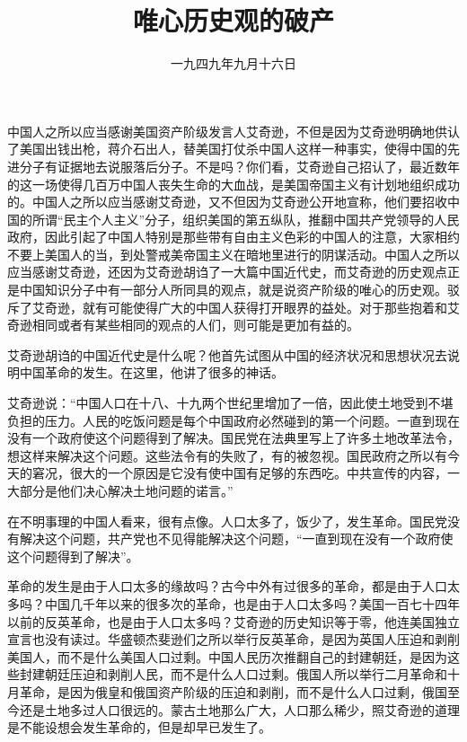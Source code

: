 
\title{唯心历史观的破产}
\date{一九四九年九月十六日}
\maketitle


中国人之所以应当感谢美国资产阶级发言人艾奇逊，不但是因为艾奇逊明确地供认了美国出钱出枪，蒋介石出人，替美国打仗杀中国人这样一种事实，使得中国的先进分子有证据地去说服落后分子。不是吗？你们看，艾奇逊自己招认了，最近数年的这一场使得几百万中国人丧失生命的大血战，是美国帝国主义有计划地组织成功的。中国人之所以应当感谢艾奇逊，又不但因为艾奇逊公开地宣称，他们要招收中国的所谓“民主个人主义”分子，组织美国的第五纵队，推翻中国共产党领导的人民政府，因此引起了中国人特别是那些带有自由主义色彩的中国人的注意，大家相约不要上美国人的当，到处警戒美帝国主义在暗地里进行的阴谋活动。中国人之所以应当感谢艾奇逊，还因为艾奇逊胡诌了一大篇中国近代史，而艾奇逊的历史观点正是中国知识分子中有一部分人所同具的观点，就是说资产阶级的唯心的历史观。驳斥了艾奇逊，就有可能使得广大的中国人获得打开眼界的益处。对于那些抱着和艾奇逊相同或者有某些相同的观点的人们，则可能是更加有益的。

艾奇逊胡诌的中国近代史是什么呢？他首先试图从中国的经济状况和思想状况去说明中国革命的发生。在这里，他讲了很多的神话。

艾奇逊说：“中国人口在十八、十九两个世纪里增加了一倍，因此使土地受到不堪负担的压力。人民的吃饭问题是每个中国政府必然碰到的第一个问题。一直到现在没有一个政府使这个问题得到了解决。国民党在法典里写上了许多土地改革法令，想这样来解决这个问题。这些法令有的失败了，有的被忽视。国民政府之所以有今天的窘况，很大的一个原因是它没有使中国有足够的东西吃。中共宣传的内容，一大部分是他们决心解决土地问题的诺言。”

在不明事理的中国人看来，很有点像。人口太多了，饭少了，发生革命。国民党没有解决这个问题，共产党也不见得能解决这个问题，“一直到现在没有一个政府使这个问题得到了解决”。

革命的发生是由于人口太多的缘故吗？古今中外有过很多的革命，都是由于人口太多吗？中国几千年以来的很多次的革命，也是由于人口太多吗？美国一百七十四年以前的反英革命，也是由于人口太多吗？艾奇逊的历史知识等于零，他连美国独立宣言也没有读过。华盛顿杰斐逊们之所以举行反英革命，是因为英国人压迫和剥削美国人，而不是什么美国人口过剩。中国人民历次推翻自己的封建朝廷，是因为这些封建朝廷压迫和剥削人民，而不是什么人口过剩。俄国人所以举行二月革命和十月革命，是因为俄皇和俄国资产阶级的压迫和剥削，而不是什么人口过剩，俄国至今还是土地多过人口很远的。蒙古土地那么广大，人口那么稀少，照艾奇逊的道理是不能设想会发生革命的，但是却早已发生了。

